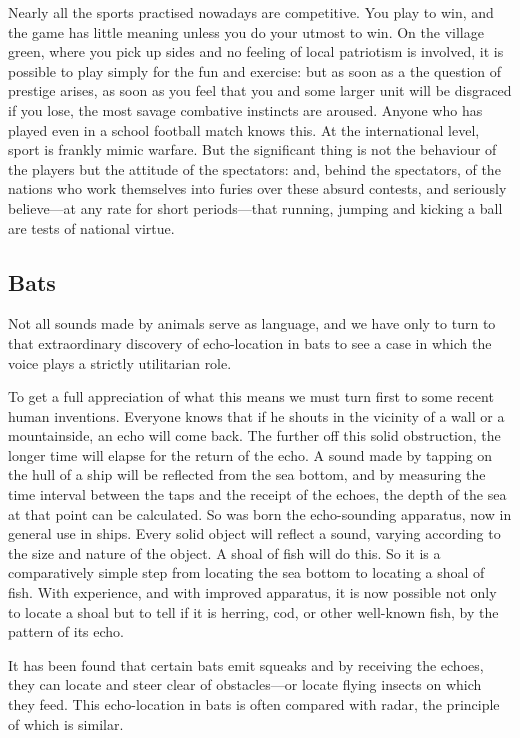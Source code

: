 \documentclass[11pt]{article}
\begin{document}
Nearly all the sports practised nowadays are competitive. You play to win, and the game has little meaning unless you do your utmost to win. On the village green, where you pick up sides and no feeling of local patriotism is involved, it is possible to play simply for the fun and exercise: but as soon as a the question of prestige arises, as soon as you feel that you and some larger unit will be disgraced if you lose, the most savage combative instincts are aroused. Anyone who has played even in a school football match knows this. At the international level, sport is frankly mimic warfare. But the significant thing is not the behaviour of the players but the attitude of the spectators: and, behind the spectators, of the nations who work themselves into furies over these absurd contests, and seriously believe---at any rate for short periods---that running, jumping and kicking a ball are tests of national virtue.
\subsection{Bats}
\label{sec-2-7}

Not all sounds made by animals serve as language, and we have only to turn to that extraordinary discovery of echo-location in bats to see a case in which the voice plays a strictly utilitarian role.

To get a full appreciation of what this means we must turn first to some recent human inventions. Everyone knows that if he shouts in the vicinity of a wall or a mountainside, an echo will come back. The further off this solid obstruction, the longer time will elapse for the return of the echo. A sound made by tapping on the hull of a ship will be reflected from the sea bottom, and by measuring the time interval between the taps and the receipt of the echoes, the depth of the sea at that point can be calculated. So was born the echo-sounding apparatus, now in general use in ships. Every solid object will reflect a sound, varying according to the size and nature of the object. A shoal of fish will do this. So it is a comparatively simple step from locating the sea bottom to locating a shoal of fish. With experience, and with improved apparatus, it is now possible not only to locate a shoal but to tell if it is herring, cod, or other well-known fish, by the pattern of its echo.

It has been found that certain bats emit squeaks and by receiving the echoes, they can locate and steer clear of obstacles---or locate flying insects on which they feed. This echo-location in bats is often compared with radar, the principle of which is similar.
\end{document}
